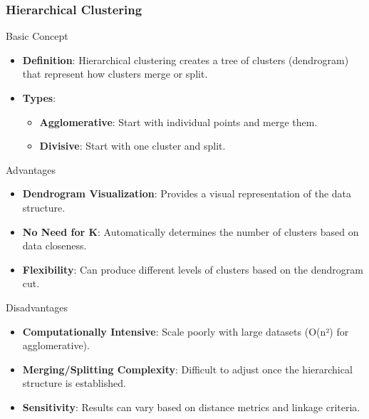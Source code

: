 \documentclass[aspectratio=169]{beamer}
\begin{document}
\begin{frame}[fragile]
    \frametitle{Hierarchical Clustering}
    
    \begin{block}{Basic Concept}
        \begin{itemize}
            \item \textbf{Definition}: Hierarchical clustering creates a tree of clusters (dendrogram) that represent how clusters merge or split.
            \item \textbf{Types}:
                \begin{itemize}
                    \item \textbf{Agglomerative}: Start with individual points and merge them.
                    \item \textbf{Divisive}: Start with one cluster and split.
                \end{itemize}
        \end{itemize}
    \end{block}
    
    \begin{block}{Advantages}
        \begin{itemize}
            \item \textbf{Dendrogram Visualization}: Provides a visual representation of the data structure.
            \item \textbf{No Need for K}: Automatically determines the number of clusters based on data closeness.
            \item \textbf{Flexibility}: Can produce different levels of clusters based on the dendrogram cut.
        \end{itemize}
    \end{block}
    
    \begin{block}{Disadvantages}
        \begin{itemize}
            \item \textbf{Computationally Intensive}: Scale poorly with large datasets (O(n²) for agglomerative).
            \item \textbf{Merging/Splitting Complexity}: Difficult to adjust once the hierarchical structure is established.
            \item \textbf{Sensitivity}: Results can vary based on distance metrics and linkage criteria.
        \end{itemize}
    \end{block}
\end{frame}
\end{document}
